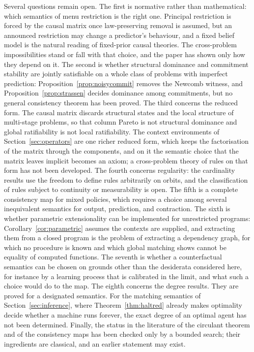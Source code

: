 Several questions remain open. The first is normative rather than mathematical: which semantics of
menu restriction is the right one. Principal restriction is forced by the causal matrix once
law-preserving removal is assumed, but an announced restriction may change a predictor's behaviour,
and a fixed belief model is the natural reading of fixed-prior causal theories. The cross-problem
impossibilities stand or fall with that choice, and the paper has shown only how they depend on it.
The second is whether structural dominance and commitment stability are jointly satisfiable on a
whole class of problems with imperfect prediction: Proposition~\ref{prop:noisycommit} removes the
Newcomb witness, and Proposition~\ref{prop:strassen} decides dominance among commitments, but no
general consistency theorem has been proved. The third concerns the reduced form. The causal matrix
discards structural states and the local structure of multi-stage problems, so that column Pareto is
not structural dominance and global ratifiability is not local ratifiability. The context environments
of Section~\ref{sec:operators} are one richer reduced form, which keeps the factorisation of the matrix
through the components, and on it the semantic choice that the matrix leaves implicit becomes an axiom;
a cross-problem theory of rules on that form has not been developed. The fourth concerns
regularity: the cardinality results use the freedom to define rules arbitrarily on orbits, and the
classification of rules subject to continuity or measurability is open. The fifth is a complete
consistency map for mixed policies, which requires a choice among several inequivalent semantics for
output, prediction, and contraction. The sixth is whether parametric extensionality can be
implemented for unrestricted programs: Corollary~\ref{cor:parametric} assumes the contexts are
supplied, and extracting them from a closed program is the problem of extracting a dependency graph,
for which no procedure is known and which global matching shows cannot be equality of computed
functions. The seventh is whether a counterfactual semantics can be chosen on grounds other than the
desiderata considered here, for instance by a learning process that is calibrated in the limit, and
what such a choice would do to the map. The eighth concerns the degree results. They are proved for a
designated semantics. For the matching semantics of Section~\ref{sec:inference}, where
Theorem~\ref{thm:haltred} already makes optimality decide whether a machine runs forever, the exact
degree of an optimal agent has not been determined. Finally, the status in the literature of the circulant
theorem and of the consistency maps has been checked only by a bounded search; their ingredients are
classical, and an earlier statement may exist.
